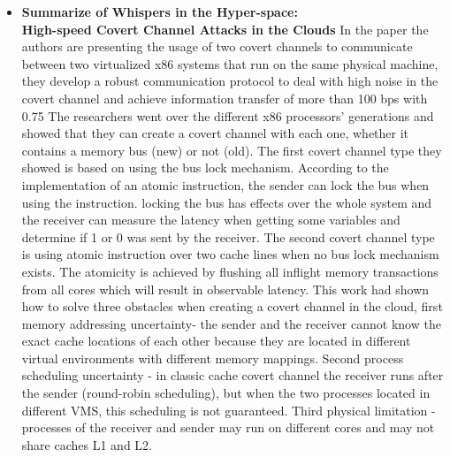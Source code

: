 \begin{itemize}
    \item  \textbf{Summarize of Whispers in the Hyper-space:}
    \\ \textbf{High-speed Covert Channel Attacks in the Clouds} 
    In the paper \cite{cloud_covert_channel_usenix12} the authors are presenting the usage of two covert channels to communicate between two virtualized x86 systems that run on the same physical machine, they develop a robust communication protocol to deal with high noise in the covert channel and achieve information transfer of more than 100 bps with 0.75%
    The researchers went over the different x86 processors’ generations and showed that they can create a covert channel with each one, whether it contains a memory bus (new) or not (old). The first covert channel type they showed is based on using the bus lock mechanism. According to the implementation of an atomic instruction, the sender can lock the bus when using the instruction. locking the bus has effects over the whole system and the receiver can measure the latency when getting some variables and determine if 1 or 0 was sent by the receiver.
    The second covert channel type is using atomic instruction over two cache lines when no bus lock mechanism exists. The atomicity is achieved by flushing all inflight memory transactions from all cores which will result in observable latency.
    This work had shown how to solve three obstacles when creating a covert channel in the cloud, first memory addressing uncertainty- the sender and the receiver cannot know the exact cache locations of each other because they are located in different virtual environments with different memory mappings. Second process scheduling uncertainty - in classic cache covert channel the receiver runs after the sender (round-robin scheduling), but when the two processes located in different VMS, this scheduling is not guaranteed. Third physical limitation - processes of the receiver and sender may run on different cores and may not share caches L1 and L2.


\end{itemize}
